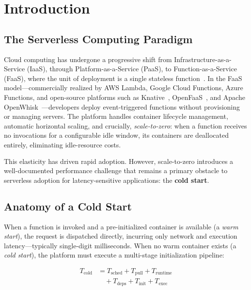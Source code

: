 \documentclass[final,5p,times,twocolumn]{elsarticle}
\begin{document}
\section{Introduction}

\subsection{The Serverless Computing Paradigm}

Cloud computing has undergone a progressive shift from Infrastructure-as-a-Service (IaaS), through Platform-as-a-Service (PaaS), to Function-as-a-Service (FaaS), where the unit of deployment is a single stateless function~\cite{jonas2019cloud}. In the FaaS model---commercially realized by AWS Lambda, Google Cloud Functions, Azure Functions, and open-source platforms such as Knative~\cite{knative2024}, OpenFaaS~\cite{openfaas2024}, and Apache OpenWhisk~\cite{openwhisk2024}---developers deploy event-triggered functions without provisioning or managing servers. The platform handles container lifecycle management, automatic horizontal scaling, and crucially, \emph{scale-to-zero}: when a function receives no invocations for a configurable idle window, its containers are deallocated entirely, eliminating idle-resource costs.

This elasticity has driven rapid adoption. However, scale-to-zero introduces a well-documented performance challenge that remains a primary obstacle to serverless adoption for latency-sensitive applications: the \textbf{cold start}.

\subsection{Anatomy of a Cold Start}

When a function is invoked and a pre-initialized container is available (a \emph{warm start}), the request is dispatched directly, incurring only network and execution latency---typically single-digit milliseconds. When no warm container exists (a \emph{cold start}), the platform must execute a multi-stage initialization pipeline:

\begin{equation}
\begin{split}
T_{\text{cold}} &= T_{\text{sched}} + T_{\text{pull}} + T_{\text{runtime}} \\
&\quad + T_{\text{deps}} + T_{\text{init}} + T_{\text{exec}}
\end{split}
\end{equation}
\end{document}
